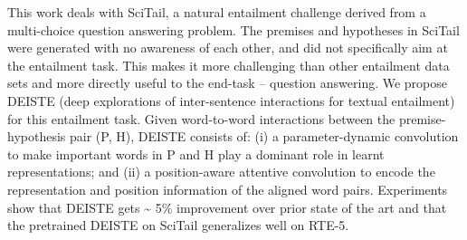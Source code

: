 This work deals with SciTail, a natural entailment challenge derived from a multi-choice question answering problem. The premises and hypotheses in SciTail were generated with no awareness of each other, and did not specifically aim at the entailment task. This makes it more challenging than other entailment data sets and more directly useful to the end-task -- question answering. We propose DEISTE (deep explorations of inter-sentence interactions for textual entailment) for this entailment task. Given word-to-word interactions between the premise-hypothesis pair (P, H), DEISTE consists of: (i) a parameter-dynamic convolution to make important words in P and H play a dominant role in learnt representations; and (ii) a position-aware attentive convolution to encode the representation and position information of the aligned word pairs.  Experiments show that  DEISTE gets {\textasciitilde} 5\% improvement over prior state of the art and that the pretrained DEISTE on SciTail generalizes well on RTE-5.
